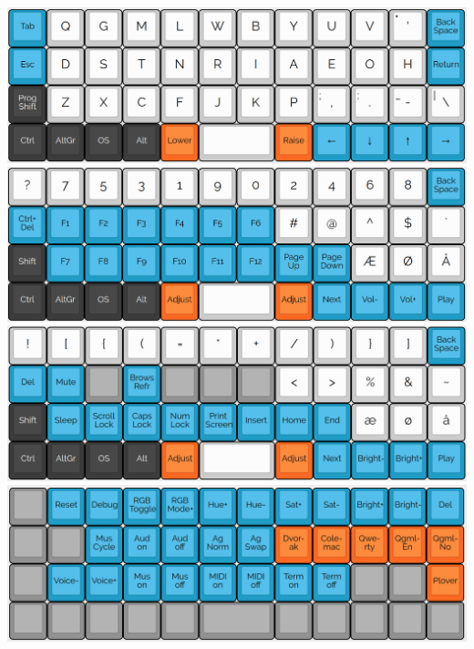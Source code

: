 \documentclass{article}
\begin{document}
\begin{center}
	\includegraphics[scale=0.35]{Default.png}
	\includegraphics[scale=0.35]{Raise.png}
	\includegraphics[scale=0.35]{Lower.png}
	\includegraphics[scale=0.35]{Adjust.png}
\end{center}
\end{document}

